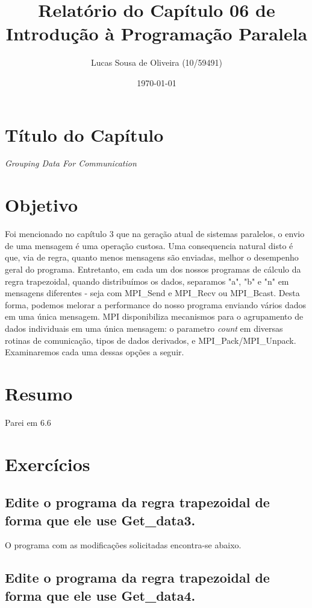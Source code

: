 \documentclass[11pt,a4paper,onecolumn]{article}
\title{Relatório do Capítulo 06 de\\Introdução à Programação Paralela}
\author{Lucas Sousa de Oliveira (10/59491)}
\date{\today}
\begin{document}
\maketitle

\section{Título do Capítulo}
\textit{Grouping Data For Communication}

\section{Objetivo}
Foi mencionado no capítulo 3 que na geração atual de sistemas paralelos, o envio de uma mensagem é uma operação custosa.
Uma consequencia natural disto é que, via de regra, quanto menos mensagens são enviadas, melhor o desempenho geral do programa.
Entretanto, em cada um dos nossos programas de cálculo da regra trapezoidal, quando distribuímos os dados, separamos "a", "b" e "n" em mensagens diferentes - seja com MPI\_Send e MPI\_Recv ou MPI\_Bcast.
Desta forma, podemos melorar a performance do nosso programa enviando vários dados em uma única mensagem.
MPI disponibiliza mecanismos para o agrupamento de dados individuais em uma única mensagem: o parametro \textit{count} em diversas rotinas de comunicação, tipos de dados derivados, e MPI\_Pack/MPI\_Unpack.
Examinaremos cada uma dessas opções a seguir.

\section{Resumo}
\label{sec:resumo}

Parei em 6.6

\section{Exercícios}
\subsection{Edite o programa da regra trapezoidal de forma que ele use Get\_data3.}
O programa com as modificações solicitadas encontra-se abaixo.


\subsection{Edite o programa da regra trapezoidal de forma que ele use Get\_data4.}
%
\end{document}

